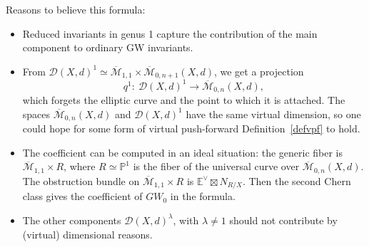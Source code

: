 \documentclass[pdftex]{sigma}
\numberwithin{equation}{section}
\newcommand{\MM}[4]{\overline{\mathcal M}_{#1,#2}(#3,#4)}
\begin{document}
Reasons to believe this formula:
\begin{itemize}\itemsep=0pt
 \item Reduced invariants in genus 1 capture the contribution of the main component to ordinary GW invariants.
 \item From $\mathcal{D}(X,d)^1\simeq \overline{\mathcal M}_{1,1}\times\MM{0}{n+1}{X}{d}$, we get a projection
 \[q^1\colon \ \mathcal{D}(X,d)^1\to \MM{0}{n}{X}{d},
 \]
 which forgets the elliptic curve and the point to which it is attached. The spaces $\MM{0}{n}{X}{d}$ and $\mathcal{D}(X,d)^1$ have the same virtual dimension, so one could hope for some form of virtual push-forward Definition~\ref{defvpf} to hold.

 \item The coefficient can be computed in an ideal situation: the generic fiber is $\overline{\mathcal M}_{1,1}\times R$, where $R\simeq\mathbb P^1$ is the fiber of the universal curve over $\MM{0}{n}{X}{d}$. The obstruction bundle on $\overline{\mathcal M}_{1,1}\times R$ is $\mathbb E^\vee\boxtimes N_{R/X}$. Then the second Chern class gives the coefficient of $GW_0$ in the formula.
 \item The other components $\mathcal{D}(X,d)^{\lambda}$, with $\lambda\neq 1$ should not contribute by (virtual) dimensional reasons.
 \end{itemize}
\end{document}
